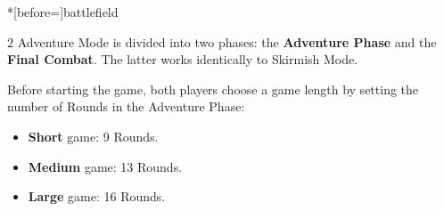 \newpage
\begin{expansion}*[before=\vspace*{-11mm}]{battlefield}
  \begin{multicols}{2}
  Adventure Mode is divided into two phases: the \textbf{Adventure Phase} and the \textbf{Final Combat}.
  The latter works identically to Skirmish Mode.\par
  Before starting the game, both players choose a game length by setting the number of Rounds in the Adventure Phase:
  \begin{itemize}
    \item \textbf{Short} game: 9 Rounds.
    \item \textbf{Medium} game: 13 Rounds.
    \item \textbf{Large} game: 16 Rounds.
  \end{itemize}

\end{multicols}
\end{expansion}
